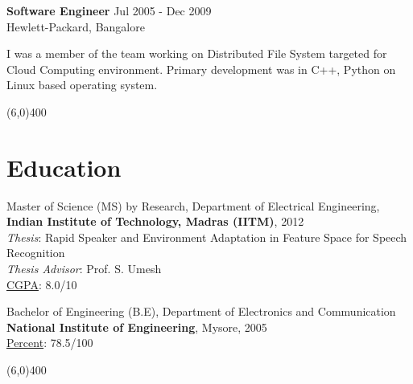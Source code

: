 \documentclass[line,margin]{res}
\begin{document}
\begin{resume}
\normalsize
 {\bf Software Engineer} \hfill Jul 2005 - Dec 2009\\
 \hfill Hewlett-Packard, Bangalore

\small
I was a member of the team working on Distributed File System targeted for Cloud Computing environment. Primary development was in C++, Python on Linux based operating system.
 
\normalsize
\vspace{-5mm}
\line(6,0){400}



\section{Education} 
\small
Master of Science (MS) by Research, Department of Electrical Engineering, \\{\bf Indian Institute of Technology, Madras (IITM)}, 2012  \\
\emph{Thesis}: Rapid Speaker and Environment Adaptation in Feature Space for Speech Recognition \\
\emph{Thesis Advisor}: Prof. S. Umesh \\
\underline {CGPA}: 8.0/10 

Bachelor of Engineering (B.E), Department of Electronics and Communication \\ {\bf National Institute of Engineering}, Mysore, 2005 \\
\underline {Percent}: 78.5/100 

\line(6,0){400}


\end{resume}
\end{document}
